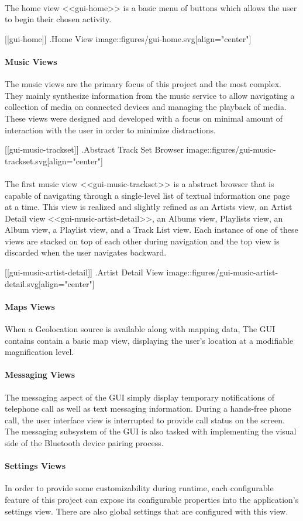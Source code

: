 \paragraph{}
The home view <<gui-home>> is a basic menu of buttons which allows the user to begin their chosen activity.

[[gui-home]]
.Home View
image::figures/gui-home.svg[align="center"]

\paragraph{Music Views}
The music views are the primary focus of this project and the most complex.
They mainly synthesize information from the music service to allow navigating a collection of media on connected devices and managing the playback of media.
These views were designed and developed with a focus on minimal amount of interaction with the user in order to minimize distractions.

[[gui-music-trackset]]
.Abstract Track Set Browser
image::figures/gui-music-trackset.svg[align="center"]

\paragraph{}
The first music view <<gui-music-trackset>> is a abstract browser that is capable of navigating through a single-level list of textual information one page at a time.
This view is realized and slightly refined as an Artists view, an Artist Detail view <<gui-music-artist-detail>>, an Albums view, Playlists view, an Album view, a Playlist view, and a Track List view.
Each instance of one of these views are stacked on top of each other during navigation and the top view is discarded when the user navigates backward.

[[gui-music-artist-detail]]
.Artist Detail View
image::figures/gui-music-artist-detail.svg[align="center"]

\paragraph{Maps Views}
When a Geolocation source is available along with mapping data, The GUI contains contain a basic map view, displaying the user's location at a modifiable magnification level.

\paragraph{Messaging Views}
The messaging aspect of the GUI simply display temporary notifications of telephone call as well as text messaging information.
During a hands-free phone call, the user interface view is interrupted to provide call status on the screen.
The messaging subsystem of the GUI is also tasked with implementing the visual side of the Bluetooth device pairing process.

\paragraph{Settings Views}
In order to provide some customizability during runtime, each configurable feature of this project can expose its configurable properties into the application's settings view.
There are also global settings that are configured with this view.
